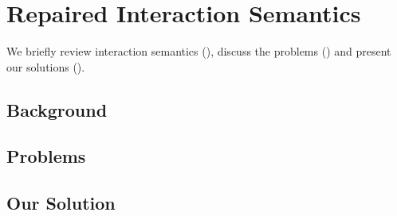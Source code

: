 \chapter{\;\;\;\;Repaired Interaction Semantics}
\label{sec:overview-semantics}

We briefly review interaction semantics (), discuss the problems () and present our solutions ().

\section{Background}
\label{sec:overview-semantics:background}

\section{Problems}
\label{sec:overview-semantics:problems}




\section{Our Solution}
\label{sec:overview-semantics:solution}

